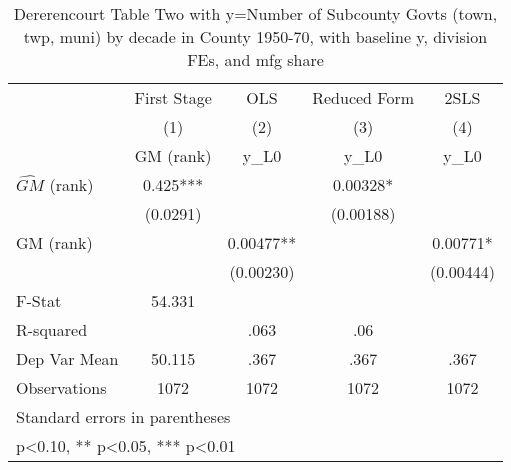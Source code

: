 \begin{table}[htbp]\centering
\def\sym#1{\ifmmode^{#1}\else\(^{#1}\)\fi}
\caption{Dererencourt Table Two with y=Number of Subcounty Govts (town, twp, muni) by decade in County 1950-70, with baseline y, division FEs, and mfg share}
\begin{tabular}{l*{4}{c}}
\toprule
                    & First Stage   &         OLS   &Reduced Form   &        2SLS   \\
                    &\multicolumn{1}{c}{(1)}&\multicolumn{1}{c}{(2)}&\multicolumn{1}{c}{(3)}&\multicolumn{1}{c}{(4)}\\
                    &\multicolumn{1}{c}{GM  (rank)}&\multicolumn{1}{c}{y\_L0}&\multicolumn{1}{c}{y\_L0}&\multicolumn{1}{c}{y\_L0}\\
\midrule
$\hat{GM}$ (rank)   &       0.425***&               &     0.00328*  &               \\
                    &    (0.0291)   &               &   (0.00188)   &               \\
\addlinespace
GM  (rank)          &               &     0.00477** &               &     0.00771*  \\
                    &               &   (0.00230)   &               &   (0.00444)   \\
\midrule
F-Stat              &      54.331   &               &               &               \\
R-squared           &               &        .063   &         .06   &               \\
Dep Var Mean        &      50.115   &        .367   &        .367   &        .367   \\
Observations        &        1072   &        1072   &        1072   &        1072   \\
\bottomrule
\multicolumn{5}{l}{\footnotesize Standard errors in parentheses}\\
\multicolumn{5}{l}{\footnotesize * p<0.10, ** p<0.05, *** p<0.01}\\
\end{tabular}
\end{table}

